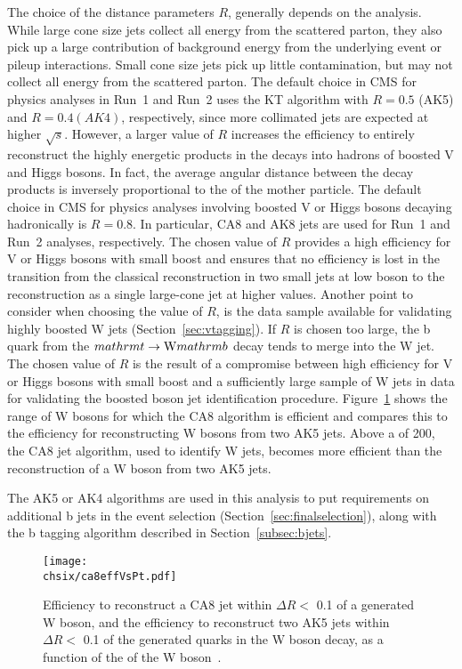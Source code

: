 The choice of the distance parameters $R$, generally depends on the analysis. While large cone size jets collect all energy from the scattered parton, they also pick up a large contribution of background energy from the underlying event or pileup interactions. Small cone size jets pick up little contamination, but may not collect all energy from the scattered parton. 
The default choice in CMS for physics analyses in Run~1 and Run~2 uses the KT algorithm with $R = 0.5$ (AK5) and $R = 0.4 (AK4)$, respectively, since more collimated jets are expected at higher $\sqrt{s}$.
However, a larger value of $R$ increases the efficiency to entirely reconstruct the highly energetic products in the decays into hadrons of boosted V and Higgs bosons.
In fact, the average angular distance between the decay products is inversely proportional to the \pt of the mother particle. The default choice in CMS for physics analyses involving boosted V or Higgs bosons decaying hadronically is $R = 0.8$. In particular, CA8 and AK8 jets are used for Run~1 and Run~2 analyses, respectively. The chosen value of $R$ provides a high efficiency for V or Higgs bosons with small boost and ensures that no efficiency is lost in the transition from the classical reconstruction in two small jets at low boson \pt to the reconstruction as a single large-cone jet at higher values. Another point to consider when choosing the value of $R$, is the \ttbar data sample available for validating highly boosted W jets (Section~\ref{sec:vtagging}). If $R$ is chosen too large, the b quark from the $\\mathrm{t}\to\mathrm{W}\\mathrm{b}$ decay tends to merge into the W jet. The chosen value of $R$ is the result of a compromise between high efficiency for V or Higgs bosons with small boost and a sufficiently large sample of W jets in \ttbar data for validating the boosted boson jet identification procedure. Figure~\ref{fig:ca8effVsPt} shows the \pt range of W bosons for which the CA8 algorithm is efficient and compares this to the efficiency for reconstructing W bosons from two AK5 jets. Above a \pt of 200\GeV, the CA8 jet algorithm, used to identify W jets, becomes more efficient than the reconstruction of a W boson from two AK5 jets.

The AK5 or AK4 algorithms are used in this analysis to put requirements on additional b jets in the event selection (Section~\ref{sec:finalselection}), along with the b tagging algorithm described in Section~\ref{subsec:bjets}.

\begin{figure}[!htb]
 \begin{center}
  \texttt{[image: \\chsix/ca8effVsPt.pdf]}
 \end{center}
 \caption{Efficiency to reconstruct a CA8 jet within $\Delta R <$ 0.1 of a generated W boson, and the efficiency to reconstruct two AK5 jets within $\Delta R <$ 0.1 of the generated quarks in the W boson decay, as a function of the \pt of the W boson~\cite{Khachatryan:2014vla}.}
 \label{fig:ca8effVsPt}
\end{figure}

